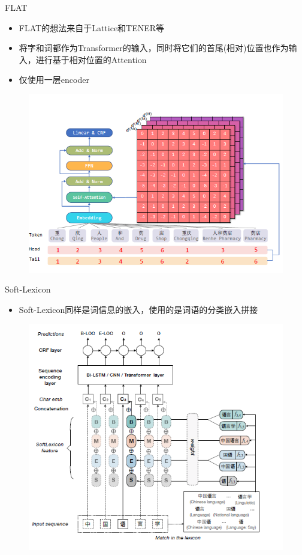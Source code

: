 \documentclass[notheorems, aspectratio=54, compress]{beamer}
\begin{document}
\begin{frame}{FLAT}
	\begin{itemize}
		\item FLAT\cite{li2020flat}的想法来自于Lattice和TENER等
		\item 将字和词都作为Transformer的输入，同时将它们的首尾(相对)位置也作为输入，进行基于相对位置的Attention
		\item 仅使用一层encoder
	\end{itemize}
	\begin{figure}
		\centering
		\includegraphics[width=0.8\linewidth,height=0.6\textheight,keepaspectratio]{FLAT Model}
	\end{figure}
\end{frame}

\begin{frame}{Soft-Lexicon}
	\begin{itemize}
		\item Soft-Lexicon\cite{peng2019simplify}同样是词信息的嵌入，使用的是词语的分类嵌入拼接
	\end{itemize}
	\begin{figure}
		\centering
		\includegraphics[width=0.8\linewidth,height=0.6\textheight,keepaspectratio]{Soft Lexicon Model}
	\end{figure}
\end{frame}
\end{document}
